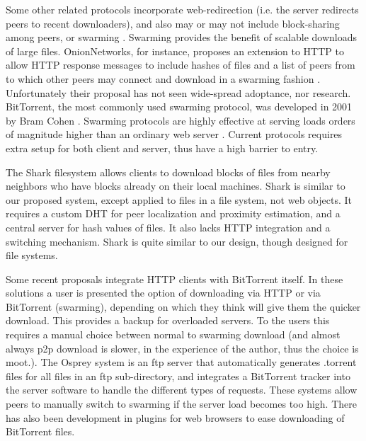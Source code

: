 Some other related protocols incorporate web-redirection (i.e. the server redirects peers to recent downloaders), and also may or may not include block-sharing among peers, or swarming \cite{overhaul, webtorrent, onion, zappala, cohen, slurpie, mutualcast, fastreplica, avalanche, bullet_prime}.  Swarming provides the benefit of scalable downloads of large files.  OnionNetworks, for instance, proposes an extension to HTTP to allow HTTP response messages to include hashes of files and a list of peers from to which other peers may connect and download in a swarming fashion \cite{onion}.  Unfortunately their proposal has not seen wide-spread adoptance, nor research.  BitTorrent, the most commonly used swarming protocol, was developed in 2001 by Bram Cohen \cite{cohen}.  Swarming protocols are highly effective at serving loads orders of magnitude higher than an ordinary web server \cite{zappala}. Current protocols requires extra setup for both client and server, thus have a high barrier to entry.

The Shark \cite{shark} filesystem allows clients to download blocks of files from nearby neighbors who have blocks already on their local machines.  Shark is similar to our proposed system, except applied to files in a file system, not web objects.  It  requires a custom DHT for peer localization and proximity estimation, and a central server for hash values of files.  It also lacks HTTP integration and a switching mechanism.  Shark is quite similar to our design, though designed for file systems.

Some recent proposals integrate HTTP clients with BitTorrent itself.  In these solutions a user is presented the option of downloading via HTTP or via BitTorrent (swarming), depending on which they think will give them the quicker download.  This provides a backup for overloaded servers.  To the users this requires a manual choice between normal to swarming download (and almost always p2p download is slower, in the experience of the author, thus the choice is moot.).  The Osprey system \cite{osprey} is an ftp server that automatically generates .torrent files for all files in an ftp sub-directory, and integrates a BitTorrent tracker into the server software to handle the different types of requests.  These systems allow peers to manually switch to swarming if the server load becomes too high.  There has also  been development in plugins for web browsers to ease downloading of BitTorrent files.


